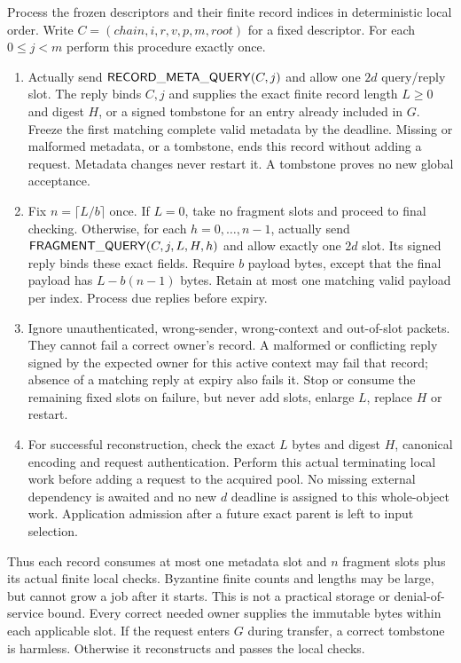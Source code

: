 Process the frozen descriptors and their finite record indices in
deterministic local order. Write
$C=(\mathit{chain},i,r,v,p,m,\mathit{root})$ for a fixed descriptor.
For each $0\le j<m$ perform this procedure exactly once.
\begin{enumerate}[label=(\arabic*),itemsep=3pt]
\item Actually send $\mathsf{RECORD\_META\_QUERY}(C,j)$ and allow one
$2d$ query/reply slot. The reply binds $C,j$ and supplies the exact
finite record length $L\ge0$ and digest $H$, or a signed tombstone for
an entry already included in $G$. Freeze the first matching complete
valid metadata by the deadline. Missing or malformed metadata, or a
tombstone, ends this record without adding a request. Metadata changes
never restart it. A tombstone proves no new global acceptance.
\item Fix $n=\lceil L/b\rceil$ once. If $L=0$, take no fragment
slots and proceed to final checking. Otherwise, for each
$h=0,\ldots,n-1$, actually send
$\mathsf{FRAGMENT\_QUERY}(C,j,L,H,h)$ and allow exactly one $2d$ slot.
Its signed reply binds these exact fields. Require $b$ payload bytes,
except that the final payload has $L-b(n-1)$ bytes. Retain at most one
matching valid payload per index. Process due replies before expiry.
\item Ignore unauthenticated, wrong-sender, wrong-context and
out-of-slot packets. They cannot fail a correct owner's record. A
malformed or conflicting reply signed by the expected owner for this
active context may fail that record; absence of a matching reply at
expiry also fails it. Stop or consume the remaining fixed slots on
failure, but never add slots, enlarge $L$, replace $H$ or restart.
\item For successful reconstruction, check the exact $L$ bytes and
digest $H$, canonical encoding and request authentication. Perform
this actual terminating local work before adding a request to the
acquired pool. No missing external dependency is awaited and no new
$d$ deadline is assigned to this whole-object work. Application
admission after a future exact parent is left to input selection.
\end{enumerate}
Thus each record consumes at most one metadata slot and $n$ fragment
slots plus its actual finite local checks. Byzantine finite counts and
lengths may be large, but cannot grow a job after it starts. This is
not a practical storage or denial-of-service bound. Every correct
needed owner supplies the immutable bytes within each applicable slot.
If the request enters $G$ during transfer, a correct tombstone is
harmless. Otherwise it reconstructs and passes the local checks.

